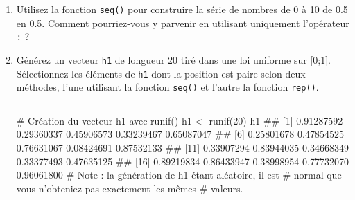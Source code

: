 \documentclass[12pt,twosided, notitlepage]{book}
\newenvironment{Shaded}{}{}
\newcommand{\KeywordTok}[1]{\textcolor[rgb]{0.00,0.00,1.00}{{#1}}}
\newcommand{\DataTypeTok}[1]{{#1}}
\newcommand{\DecValTok}[1]{{#1}}
\newcommand{\FloatTok}[1]{{#1}}
\newcommand{\StringTok}[1]{\textcolor[rgb]{0.00,0.50,0.50}{{#1}}}
\newcommand{\CommentTok}[1]{\textcolor[rgb]{0.00,0.50,0.00}{{#1}}}
\newcommand{\NormalTok}[1]{{#1}}
\newif \ifsol
\renewenvironment{Shaded}{\begin{snugshade}}{\end{snugshade}}
\begin{document}
\begin{enumerate}
\def\labelenumi{\alph{enumi}.}
\item
  Utilisez la fonction \texttt{seq()} pour
  construire la série de nombres de 0 à 10 de 0.5 en 0.5. Comment
  pourriez-vous y parvenir en utilisant uniquement l'opérateur
  \texttt{:}\index{\texttt{:}} ?

  \ifsol 

  \begin{center} \rule{0.5\linewidth}{\linethickness}\end{center}

\begin{Shaded}
\begin{Highlighting}[]
\CommentTok{# Méthode directe : utilisation de l'argument by = de seq()}
\KeywordTok{seq}\NormalTok{(}\DecValTok{0}\NormalTok{, }\DecValTok{10}\NormalTok{, }\DataTypeTok{by =} \FloatTok{0.5}\NormalTok{)}
  \NormalTok{##  [1]  0.0  0.5  1.0  1.5  2.0  2.5  3.0  3.5  4.0  4.5  5.0  5.5}
  \NormalTok{## [13]  6.0  6.5  7.0  7.5  8.0  8.5  9.0  9.5 10.0}

\CommentTok{# Méthode "manuelle" : utilisation de `:` et division}
\NormalTok{(}\DecValTok{0}\NormalTok{:}\DecValTok{20}\NormalTok{) /}\StringTok{ }\DecValTok{2}
  \NormalTok{##  [1]  0.0  0.5  1.0  1.5  2.0  2.5  3.0  3.5  4.0  4.5  5.0  5.5}
  \NormalTok{## [13]  6.0  6.5  7.0  7.5  8.0  8.5  9.0  9.5 10.0}
\end{Highlighting}
\end{Shaded}

  \begin{center} \rule{0.5\linewidth}{\linethickness}\end{center}

  \bigskip  \fi 
\item
  Générez un vecteur \texttt{h1} de longueur 20 tiré dans une loi
  uniforme sur {[}0;1{]}. Sélectionnez les
  éléments de \texttt{h1} dont la position est paire selon deux
  méthodes, l'une utilisant la fonction
  \texttt{seq()} et l'autre la fonction
  \texttt{rep()}.

  \ifsol 

  \begin{center} \rule{0.5\linewidth}{\linethickness}\end{center}

\begin{Shaded}
\begin{Highlighting}[]
\CommentTok{# Création du vecteur h1 avec runif()}
\NormalTok{h1 <-}\StringTok{ }\KeywordTok{runif}\NormalTok{(}\DecValTok{20}\NormalTok{)}
\NormalTok{h1}
  \NormalTok{##  [1] 0.91287592 0.29360337 0.45906573 0.33239467 0.65087047}
  \NormalTok{##  [6] 0.25801678 0.47854525 0.76631067 0.08424691 0.87532133}
  \NormalTok{## [11] 0.33907294 0.83944035 0.34668349 0.33377493 0.47635125}
  \NormalTok{## [16] 0.89219834 0.86433947 0.38998954 0.77732070 0.96061800}
\CommentTok{# Note : la génération de h1 étant aléatoire, il est}
\CommentTok{# normal que vous n'obteniez pas exactement les mêmes}
\CommentTok{# valeurs. }


\end{Highlighting}
\end{Shaded}
\end{enumerate}
\end{document}
